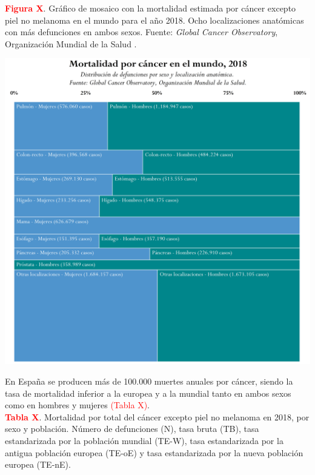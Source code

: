 \textbf{\textcolor{red}{Figura X}}. Gráfico de mosaico con la mortalidad estimada por cáncer excepto piel no melanoma en el mundo para el año 2018. Ocho localizaciones anatómicas con más defunciones en ambos sexos. Fuente: \textit{Global Cancer Observatory}, Organización Mundial de la Salud \cite{GCO}.
\begin{center}
	\includegraphics[width=1\textwidth]{figuras/marimekko_gco_mortalidad.png} \\
\end{center}

En España se producen más de 100.000 muertes anuales por cáncer, siendo la tasa de mortalidad inferior a la europea y a la mundial tanto en ambos sexos como en hombres y mujeres \textcolor{red}{(Tabla X)}.\\

\textbf{\textcolor{red}{Tabla X}}. Mortalidad por total del cáncer excepto piel no melanoma en 2018, por sexo y población. Número de defunciones (N), tasa bruta (TB), tasa estandarizada por la población mundial (TE-W),  tasa estandarizada por la antigua población europea (TE-oE) y  tasa estandarizada por la nueva población europea (TE-nE).

